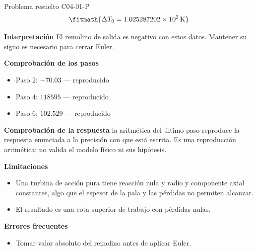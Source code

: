 \documentclass[10pt,openany]{book}
\begin{document}
\begin{studiumworked}{Problema resuelto C04-01-P}
\[
\fitmath{\Delta T_0=1.025287202\times10^{2}\,\mathrm{K}}
\]

\noindent\textbf{Interpretación}
El remolino de salida es negativo con estos datos. Mantener su signo es necesario para cerrar Euler.

\noindent\textbf{Comprobación de los pasos}
\begin{itemize}
\item Paso 2: $-70.03$ — reproducido
\item Paso 4: $118595$ — reproducido
\item Paso 6: $102.529$ — reproducido
\end{itemize}

\noindent\textbf{Comprobación de la respuesta} la aritmética del último paso reproduce la respuesta enunciada a la precisión con que está escrita. Es una reproducción aritmética; no valida el modelo físico ni sus hipótesis.

\noindent\textbf{Limitaciones}
\begin{itemize}
\item Una turbina de acción pura tiene reacción nula y radio y componente axial constantes, algo que el espesor de la pala y las pérdidas no permiten alcanzar.
\item El resultado es una cota superior de trabajo con pérdidas nulas.
\end{itemize}

\noindent\textbf{Errores frecuentes}
\begin{itemize}
\item Tomar valor absoluto del remolino antes de aplicar Euler.
\end{itemize}
\end{studiumworked}
\end{document}
